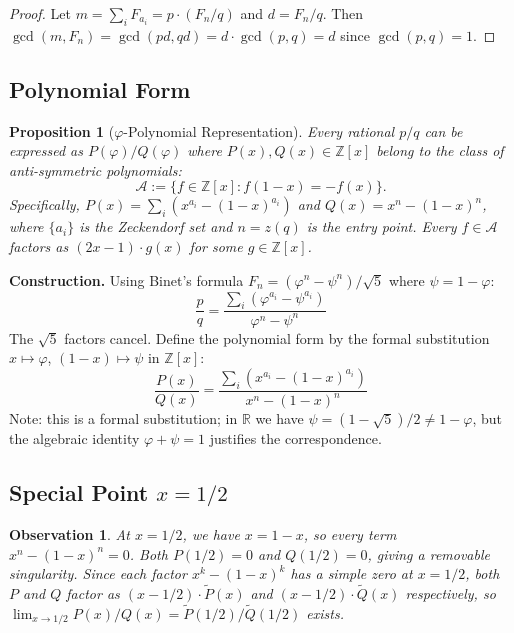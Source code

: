 \documentclass[11pt]{article}
\newtheorem{proposition}[theorem]{Proposition}
\newtheorem{observation}[theorem]{Observation}
\begin{document}
\begin{proof}
Let $m = \sum_i F_{a_i} = p \cdot (F_n/q)$ and $d = F_n/q$. Then $\gcd(m, F_n) = \gcd(pd, qd) = d \cdot \gcd(p, q) = d$ since $\gcd(p,q) = 1$.
\end{proof}

\subsection{Polynomial Form}

\begin{proposition}[$\varphi$-Polynomial Representation]
\label{prop:poly}
Every rational $p/q$ can be expressed as $P(\varphi)/Q(\varphi)$ where $P(x), Q(x) \in \mathbb{Z}[x]$
belong to the class of \emph{anti-symmetric polynomials}:
\[
\mathcal{A} := \{f \in \mathbb{Z}[x] : f(1-x) = -f(x)\}.
\]
Specifically, $P(x) = \sum_i (x^{a_i} - (1-x)^{a_i})$ and $Q(x) = x^n - (1-x)^n$,
where $\{a_i\}$ is the Zeckendorf set and $n = z(q)$ is the entry point.
Every $f \in \mathcal{A}$ factors as $(2x-1) \cdot g(x)$ for some $g \in \mathbb{Z}[x]$.
\end{proposition}

\textbf{Construction.} Using Binet's formula $F_n = (\varphi^n - \psi^n)/\sqrt{5}$ where $\psi = 1 - \varphi$:
\[
\frac{p}{q} = \frac{\sum_i (\varphi^{a_i} - \psi^{a_i})}{\varphi^n - \psi^n}
\]
The $\sqrt{5}$ factors cancel. Define the polynomial form by the formal substitution $x \mapsto \varphi$, $(1-x) \mapsto \psi$ in $\mathbb{Z}[x]$:
\[
\frac{P(x)}{Q(x)} = \frac{\sum_i (x^{a_i} - (1-x)^{a_i})}{x^n - (1-x)^n}
\]
Note: this is a formal substitution; in $\mathbb{R}$ we have $\psi = (1-\sqrt{5})/2 \neq 1 - \varphi$, but the algebraic identity $\varphi + \psi = 1$ justifies the correspondence.

\subsection{Special Point $x = 1/2$}

\begin{observation}
At $x = 1/2$, we have $x = 1-x$, so every term $x^n - (1-x)^n = 0$. Both $P(1/2) = 0$ and $Q(1/2) = 0$, giving a removable singularity. Since each factor $x^k - (1-x)^k$ has a simple zero at $x = 1/2$, both $P$ and $Q$ factor as $(x - 1/2) \cdot \tilde{P}(x)$ and $(x - 1/2) \cdot \tilde{Q}(x)$ respectively, so $\lim_{x \to 1/2} P(x)/Q(x) = \tilde{P}(1/2)/\tilde{Q}(1/2)$ exists.
\end{observation}
\end{document}
